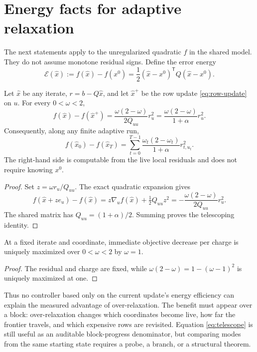 \section{Energy facts for adaptive relaxation}
\label{sec:energy}

The next statements apply to the unregularized quadratic $f$ in the shared
model.  They do not assume monotone residual signs.
Define the error energy
\begin{equation}
 \mathcal E(\widehat x)
 :=f(\widehat x)-f(x^0)
 =\frac12(\widehat x-x^0)^\mathsf TQ(\widehat x-x^0).
 \label{eq:error-energy}
\end{equation}

\begin{lemma}
\label{lem:energy}
Let $\widehat x$ be any iterate, $r=b-Q\widehat x$, and let
$\widehat x^+$ be the row update \eqref{eq:row-update} on $u$.  For every
$0<\omega<2$,
\begin{equation}
 f(\widehat x)-f(\widehat x^+)
 =\frac{\omega(2-\omega)}{2Q_{uu}}r_u^2
 =\frac{\omega(2-\omega)}{1+\alpha}r_u^2.
 \label{eq:energy-drop}
\end{equation}
Consequently, along any finite adaptive run,
\begin{equation}
 f(\widehat x_0)-f(\widehat x_T)
 =\sum_{t=0}^{T-1}
 \frac{\omega_t(2-\omega_t)}{1+\alpha}r_{t,u_t}^2.
 \label{eq:telescope}
\end{equation}
The right-hand side is computable from the live local residuals and does not
require knowing $x^0$.
\end{lemma}

\begin{proof}
Set $z=\omega r_u/Q_{uu}$.  The exact quadratic expansion gives
\[
 f(\widehat x+ze_u)-f(\widehat x)
 =z\nabla_u f(\widehat x)+\tfrac12Q_{uu}z^2
 =-\frac{\omega(2-\omega)}{2Q_{uu}}r_u^2.
\]
The shared matrix has $Q_{uu}=(1+\alpha)/2$.  Summing proves the telescoping
identity.
\end{proof}

\begin{corollary}
\label{cor:myopic}
At a fixed iterate and coordinate, immediate objective decrease per charge
is uniquely maximized over $0<\omega<2$ by $\omega=1$.
\end{corollary}

\begin{proof}
The residual and charge are fixed, while
$\omega(2-\omega)=1-(\omega-1)^2$ is uniquely maximized at one.
\end{proof}

Thus no controller based only on the current update's energy efficiency can
explain the measured advantage of over-relaxation.  The benefit must appear
over a block: over-relaxation changes which coordinates become live, how far
the frontier travels, and which expensive rows are revisited.  Equation
\eqref{eq:telescope} is still useful as an auditable block-progress
denominator, but comparing modes from the same starting state requires a
probe, a branch, or a structural theorem.
